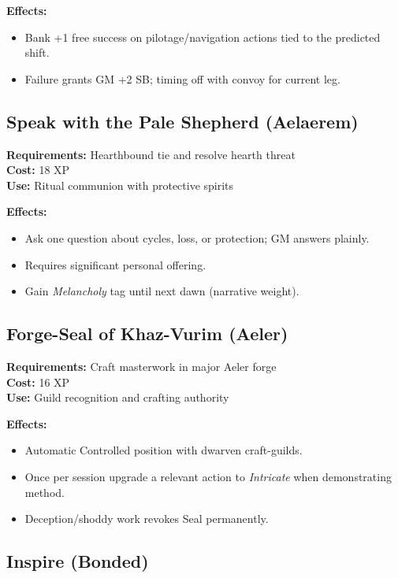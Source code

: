 \textbf{Effects:}
\begin{itemize}
\item Bank +1 free success on pilotage/navigation actions tied to the predicted shift.
\item Failure grants GM +2 SB; timing off with convoy for current leg.
\end{itemize}

\subsection{Speak with the Pale Shepherd (Aelaerem)}
\label{subsec:pale-shepherd}

\textbf{Requirements:} Hearthbound tie and resolve hearth threat\\
\textbf{Cost:} 18 XP\\
\textbf{Use:} Ritual communion with protective spirits

\textbf{Effects:}
\begin{itemize}
\item Ask one question about cycles, loss, or protection; GM answers plainly.
\item Requires significant personal offering.
\item Gain \emph{Melancholy} tag until next dawn (narrative weight).
\end{itemize}

\subsection{Forge-Seal of Khaz-Vurim (Aeler)}
\label{subsec:forge-seal}

\textbf{Requirements:} Craft masterwork in major Aeler forge\\
\textbf{Cost:} 16 XP\\
\textbf{Use:} Guild recognition and crafting authority

\textbf{Effects:}
\begin{itemize}
\item Automatic Controlled position with dwarven craft-guilds.
\item Once per session upgrade a relevant action to \emph{Intricate} when demonstrating method.
\item Deception/shoddy work revokes Seal permanently.
\end{itemize}

\subsection{Inspire (Bonded)}
\label{subsec:inspire-talent}

